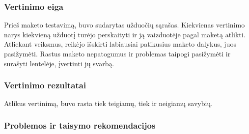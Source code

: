 	\subsubsection{Vertinimo eiga}

	Prieš maketo testavimą, buvo sudarytas užduočių sąrašas.
	Kiekvienas vertinimo narys kiekvieną užduotį turėjo perskaityti ir ją vaizduotėje pagal maketą atlikti.
	Atliekant veiksmus, reikėjo išskirti labiausiai patikusius maketo dalykus, juos pasižymėti.
	Rastus maketo nepatogumus ir problemas taipogi pasižymėti ir surašyti lentelėje, įvertinti jų svarbą.

	\subsubsection{Vertinimo rezultatai}

	Atlikus vertinimą, buvo rasta tiek teigiamų, tiek ir neigiamų savybių.
	

	\subsubsection{Problemos ir taisymo rekomendacijos}
	
